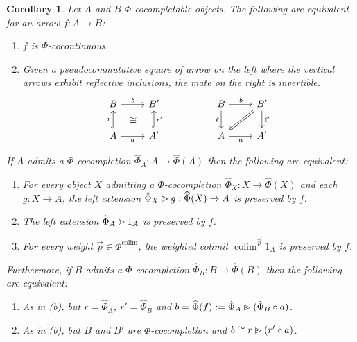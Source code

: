 \documentclass[10pt,a4paper]{article}
\newcommand{\coce}[2]{{\hat{#1}}_{#2}}
\newcommand{\coc}[2]{{\widehat{#1}}(#2)}
\newcommand{\plext}{\mathbin{{\rhd}\mathclap{\mspace{-17.5mu}\cdot}}}
\newcommand{\simeqq}{\cong}
\DeclareMathOperator{\colim}{colim}
\theoremstyle{plain}
\newtheorem{corollary}[theorem]{Corollary}
\theoremstyle{definition}
\theoremstyle{remark}
\begin{document}
\begin{corollary}
    Let $A$ and $B$ $\Phi$-cocompletable objects. The following are equivalent for an arrow $f : A \to B$:
    \begin{enumerate}
        \item $f$ is $\Phi$-cocontinuous.
        \item Given a pseudocommutative square of arrow on the left where the vertical arrows exhibit reflective inclusions, the mate on the right is invertible.
            \[\begin{tikzcd}
                B \ar[r, "b", ""{anchor=center,name=t}] & B'\\
                \ar[u, hook, "r"] A \ar[r, "a"', ""{anchor=center,name=b}] & A' \ar[u, hook, "r'"']
                \ar[from=t, to=b, phantom, "\simeqq"{anchor=center}]
            \end{tikzcd}
            \hspace{5em}
            \begin{tikzcd}
                \ar[d, "\ell"'] B \ar[r, "b"] & \ar[dl, Rightarrow] B' \ar[d, "\ell'"]\\
                A \ar[r, "a"'] & A'
            \end{tikzcd}\]
    \end{enumerate}
    If $A$ admits a $\Phi$-cocompletion $\coce\Phi A : A \to \coc\Phi A$ then the following are equivalent:
    \begin{enumerate}[resume]
        \item For every object $X$ admitting a $\Phi$-cocompletion $\coce\Phi X : X \to \coc\Phi X$ and each $g : X \to A$, the left extension $\coce\Phi X \plext g : \coc\Phi X\to A$ is preserved by $f$.
        \item The left extension $\coce\Phi A\plext 1_A$ is preserved by $f$.
        \item For every weight $\vec p\in\Phi^{\colim}$, the weighted colimit $\colim^{\vec p}1_A$ is preserved by $f$.
    \end{enumerate}
    Furthermore, if $B$ admits a $\Phi$-cocompletion $\coce\Phi B : B \to \coc\Phi B$ then the following are equivalent:
    \begin{enumerate}[resume]
        \item As in (b), but $r = \coce\Phi A$, $r' = \coce\Phi B$ and $b = \coc\Phi f := \coce\Phi A\plext (\coce\Phi B\circ a)$.
        \item As in (b), but $B$ and $B'$ are $\Phi$-cocompletion and $b\simeqq r\plext(r'\circ a)$.
    \end{enumerate}
\end{corollary}
\end{document}
